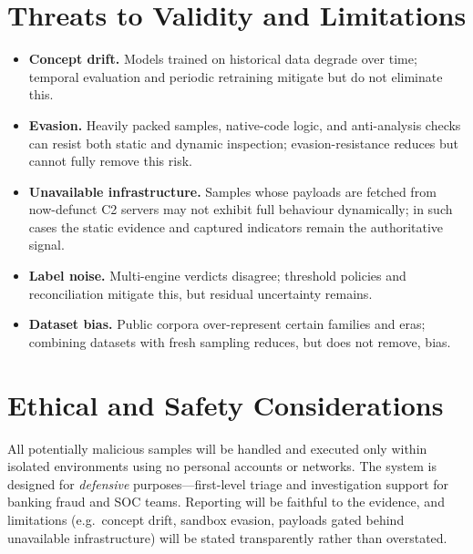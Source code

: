 \documentclass[11pt,a4paper]{article}
\begin{document}
\section{Threats to Validity and Limitations}
\begin{itemize}
    \item \textbf{Concept drift.} Models trained on historical data degrade over time; temporal evaluation and periodic retraining mitigate but do not eliminate this.
    \item \textbf{Evasion.} Heavily packed samples, native-code logic, and anti-analysis checks can resist both static and dynamic inspection; evasion-resistance reduces but cannot fully remove this risk.
    \item \textbf{Unavailable infrastructure.} Samples whose payloads are fetched from now-defunct C2 servers may not exhibit full behaviour dynamically; in such cases the static evidence and captured indicators remain the authoritative signal.
    \item \textbf{Label noise.} Multi-engine verdicts disagree; threshold policies and reconciliation mitigate this, but residual uncertainty remains.
    \item \textbf{Dataset bias.} Public corpora over-represent certain families and eras; combining datasets with fresh sampling reduces, but does not remove, bias.
\end{itemize}

\section{Ethical and Safety Considerations}
All potentially malicious samples will be handled and executed only within isolated
environments using no personal accounts or networks. The system is designed for
\emph{defensive} purposes---first-level triage and investigation support for banking
fraud and SOC teams. Reporting will be faithful to the evidence, and limitations
(e.g.\ concept drift, sandbox evasion, payloads gated behind unavailable infrastructure)
will be stated transparently rather than overstated.
\end{document}
